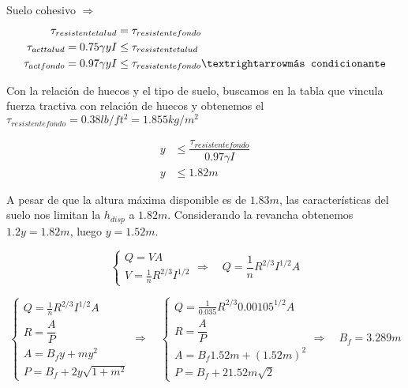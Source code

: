 \documentclass[10.5pt]{article}
\begin{document}
Suelo cohesivo $\Longrightarrow$
\begin{align*}
 \tau_{resistente talud} &= \tau_{resistente fondo} \\
 \tau_{act talud} = 0.75 \gamma y I &\leq \tau_{resistente talud} \\
 \tau_{act fondo} = 0.97 \gamma y I &\leq \tau_{resistente fondo} \textrightarrow \texttt{más condicionante}
\end{align*}

Con la relación de huecos y el tipo de suelo, buscamos en la tabla que vincula fuerza tractiva con relación de huecos y obtenemos
el $\tau_{resistente fondo} = 0.38 lb/ ft^2 = 1.855 kg/m^2$

\begin{align*}
 y &\leq \dfrac{\tau_{resistente fondo}}{0.97 \gamma I} \\
 y &\leq 1.82 m
\end{align*}

A pesar de que la altura máxima disponible es de $1.83 m$, las características del suelo nos limitan la $h_{disp}$ a $1.82 m$.
Considerando la revancha obtenemos $1.2 y = 1.82 m$, luego $y = 1.52 m$.


\begin{equation*}
  \begin{cases}
    Q = V A \\
    V =  \frac{1}{n} R^{2/3} I^{1/2}
  \end{cases}
  \Longrightarrow \quad
  Q = \frac{1}{n} R^{2/3} I^{1/2} A
\end{equation*}


\begin{equation*}
  \begin{cases}
    Q = \frac{1}{n} R^{2/3} I^{1/2} A \\
    R = \dfrac{A}{P} \\
    A = B_{f}y + m y^{2} \\
    P = B_{f} + 2 y \sqrt{1 + m^{2}}
  \end{cases}
  \Longrightarrow \quad
  \begin{cases}
    Q = \frac{1}{0.035} R^{2/3} 0.00105^{1/2} A \\
    R = \dfrac{A}{P} \\
    A = B_{f}1.52 m + (1.52 m)^2 \\
    P = B_{f} + 2 1.52 m \sqrt{2}
  \end{cases}
  \Longrightarrow \quad
  B_{f} = 3.289 m
\end{equation*}
\end{document}
